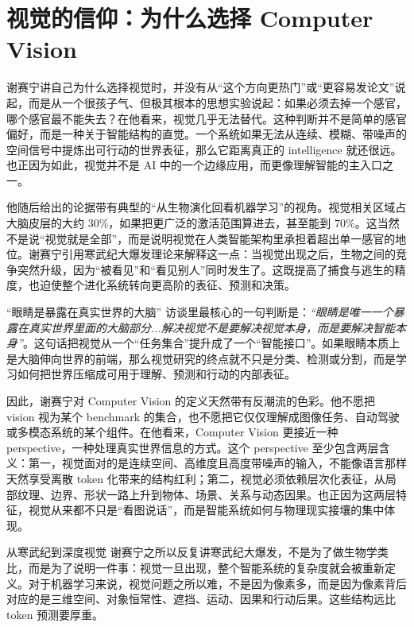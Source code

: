 \section{视觉的信仰：为什么选择 Computer Vision}

谢赛宁讲自己为什么选择视觉时，并没有从“这个方向更热门”或“更容易发论文”说起，而是从一个很孩子气、但极其根本的思想实验说起：如果必须去掉一个感官，哪个感官最不能失去？在他看来，视觉几乎无法替代。这种判断并不是简单的感官偏好，而是一种关于智能结构的直觉。一个系统如果无法从连续、模糊、带噪声的空间信号中提炼出可行动的世界表征，那么它距离真正的 intelligence 就还很远。也正因为如此，视觉并不是 AI 中的一个边缘应用，而更像理解智能的主入口之一。

他随后给出的论据带有典型的“从生物演化回看机器学习”的视角。视觉相关区域占大脑皮层的大约 \(30\%\)，如果把更广泛的激活范围算进去，甚至能到 \(70\%\)。这当然不是说“视觉就是全部”，而是说明视觉在人类智能架构里承担着超出单一感官的地位。谢赛宁引用寒武纪大爆发理论来解释这一点：当视觉出现之后，生物之间的竞争突然升级，因为“被看见”和“看见别人”同时发生了。这既提高了捕食与逃生的精度，也迫使整个进化系统转向更高阶的表征、预测和决策。

\begin{importantbox}{“眼睛是暴露在真实世界的大脑”}
访谈里最核心的一句判断是：\textit{``眼睛是唯一一个暴露在真实世界里面的大脑部分...解决视觉不是要解决视觉本身，而是要解决智能本身''}。这句话把视觉从一个“任务集合”提升成了一个“智能接口”。如果眼睛本质上是大脑伸向世界的前端，那么视觉研究的终点就不只是分类、检测或分割，而是学习如何把世界压缩成可用于理解、预测和行动的内部表征。
\end{importantbox}

因此，谢赛宁对 Computer Vision 的定义天然带有反潮流的色彩。他不愿把 vision 视为某个 benchmark 的集合，也不愿把它仅仅理解成图像任务、自动驾驶或多模态系统的某个组件。在他看来，Computer Vision 更接近一种 perspective，一种处理真实世界信息的方式。这个 perspective 至少包含两层含义：第一，视觉面对的是连续空间、高维度且高度带噪声的输入，不能像语言那样天然享受离散 token 化带来的结构红利；第二，视觉必须依赖层次化表征，从局部纹理、边界、形状一路上升到物体、场景、关系与动态因果。也正因为这两层特征，视觉从来都不只是“看图说话”，而是智能系统如何与物理现实接壤的集中体现。

\begin{knowledgebox}{从寒武纪到深度视觉}
谢赛宁之所以反复讲寒武纪大爆发，不是为了做生物学类比，而是为了说明一件事：视觉一旦出现，整个智能系统的复杂度就会被重新定义。对于机器学习来说，视觉问题之所以难，不是因为像素多，而是因为像素背后对应的是三维空间、对象恒常性、遮挡、运动、因果和行动后果。这些结构远比 token 预测要厚重。
\end{knowledgebox}

